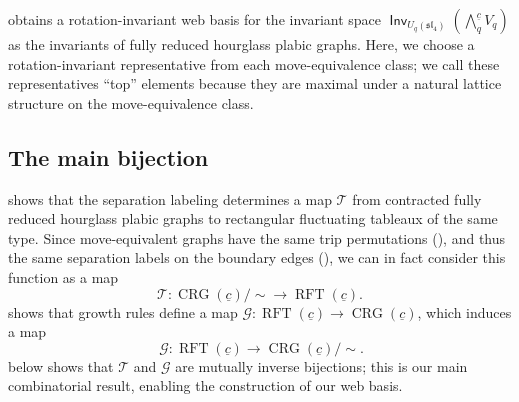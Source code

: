 \documentclass{amsart}
\theoremstyle{definition}
\theoremstyle{remark}
\numberwithin{equation}{section}
\DeclareMathOperator{\rft}{RFT}
\newcommand{\fsl}{\mathfrak{sl}}
\DeclareMathOperator{\Inv}{\mathsf{Inv}}
\DeclareMathOperator{\crg}{CRG}
\begin{document}
 obtains a rotation-invariant web basis for the invariant space $\Inv_{U_q(\fsl_4)} (\bigwedge_q^{\underline{c}} V_q)$ as the invariants of fully reduced hourglass plabic graphs. Here, we choose a rotation-invariant representative from each move-equivalence class; we call these representatives ``top'' elements because they are maximal under a natural lattice structure on the move-equivalence class.

\subsection{The main bijection}
\label{sec:main-bijection}
 shows that the separation labeling determines a map $\mathcal{T}$ from contracted fully reduced hourglass plabic graphs to rectangular fluctuating tableaux of the same type. Since move-equivalent graphs have the same trip permutations (), and thus the same separation labels on the boundary edges (), we can in fact consider this function as a map
\[\mathcal{T}: \crg(\underline{c})/{\sim} \to \rft(\underline{c}).\]
 shows that growth rules define a map $\mathcal{G}: \rft(\underline{c})\to \crg(\underline{c})$, which induces a map
\[\ \mathcal{G}:\rft(\underline{c}) \to \crg(\underline{c})/{\sim}.\]  below shows that $\mathcal{T}$ and $\mathcal{G}$ are mutually inverse bijections; this is our main combinatorial result, enabling the construction of our web basis.
\end{document}
